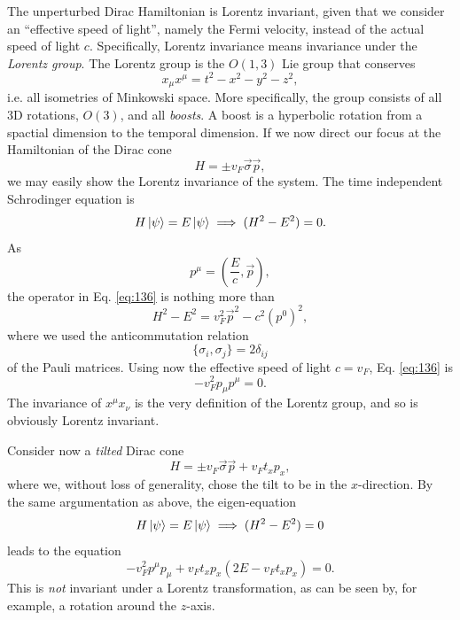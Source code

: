 The unperturbed Dirac Hamiltonian is Lorentz invariant, given that we consider an ``effective speed of light'', namely the Fermi velocity, instead of the actual speed of light \( c \).
Specifically, Lorentz invariance means invariance under the \emph{Lorentz group}.
The Lorentz group is the \( O(1,3) \) Lie group that conserves
\[
x_{\mu } x^{\mu } = t^2 - x^2 - y^2 - z^2,
\]
i.e. all isometries of Minkowski space.
More specifically, the group consists of all 3D rotations, \( O(3) \), and all \emph{boosts}.
A boost is a hyperbolic rotation from a spactial dimension to the temporal dimension.
If we now direct our focus at the Hamiltonian of the Dirac cone
\[
H = \pm v_{F} \vec{\sigma} \vec{p},
\]
we may easily show the Lorentz invariance of the system.
The time independent Schrodinger equation is
\begin{equation}
  \label{eq:136}
  H \ket{\psi } = E \ket{\psi } \implies (H^2 - E^2) = 0.
\end{equation}
As
\[
p^{\mu } = \left(\frac{E}{c}, \vec{p}\right),
\]
the operator in Eq. \eqref{eq:136} is nothing more than
\begin{equation}
  \label{eq:137}
  H^2-E^2 = v_{F}^2 \vec{p}^2 - c^2 \left(p^0\right)^2 ,
\end{equation}
where we used the anticommutation relation
\[
\{\sigma_{i}, \sigma_{j}\} =  2 \delta _{ij}
\]
of the Pauli matrices.
Using now the effective speed of light \( c=v_F \), Eq. \eqref{eq:136} is
\begin{equation}
  \label{eq:138}
  - v_F^2 p_{\mu } p^{\mu } = 0.
\end{equation}
The invariance of \( x^{\mu} x_{\nu} \) is the very definition of the Lorentz group, and so is obviously Lorentz invariant.

Consider now a \emph{tilted} Dirac cone
\begin{equation}
  \label{eq:139}
  H = \pm v_F \vec{\sigma} \vec{p} + v_F t_x p_x,
\end{equation}
where we, without loss of generality, chose the tilt to be in the \( x \)-direction.
By the same argumentation as above, the eigen-equation
\[
  H \ket{\psi} = E\ket{\psi} \implies (H^2 - E^2) = 0
\]
leads to the equation
\begin{equation}
  \label{eq:140}
  -v_F^2 p^{\mu} p_{\mu} + v_{F} t_{x} p_x (2 E - v_F t_x p_x) = 0.
\end{equation}
This is \emph{not} invariant under a Lorentz transformation, as can be seen by, for example, a rotation around the \( z \)-axis.

